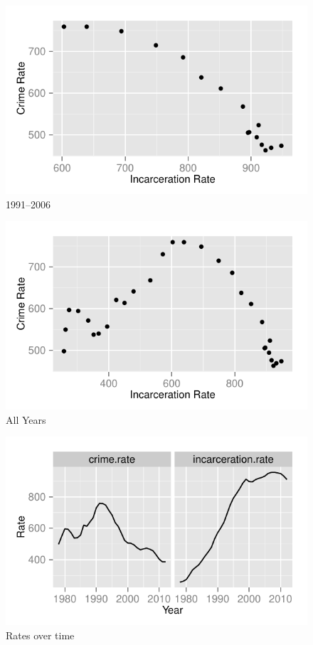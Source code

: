 \documentclass[landscape]{exam}
\begin{document}
  \begin{figure}[H]
    \centering
    \includegraphics{figures/crime/incarceration_vs_crime_after_1991.pdf}
    \caption{1991--2006}\label{fig:after_1991}
  \end{figure}

  \begin{figure}[H]
    \centering
    \includegraphics{figures/crime/incarceration_vs_crime.pdf}
    \caption{All Years}\label{fig:all_years}
  \end{figure}

  \begin{figure}[H]
    \centering
    \includegraphics{figures/crime/rates_over_time.pdf}
    \caption{Rates over time}\label{fig:rates_over_time}
  \end{figure}
\end{document}
